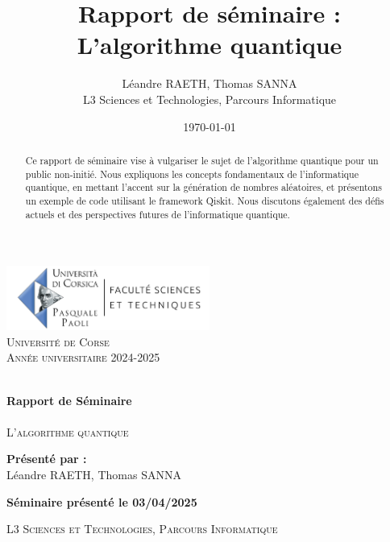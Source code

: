 \documentclass{article}
\title{Rapport de séminaire :\\L'algorithme quantique}
\author{Léandre RAETH, Thomas SANNA\\L3 Sciences et Technologies, Parcours Informatique}
\date{\today}
\begin{document}
\begin{titlepage}
  \begin{center}
      \includegraphics[width=0.5\textwidth]{img/univCorse.png}\\[1cm]
      
      \textsc{\LARGE Université de Corse}\\[1.5cm]
      
      \textsc{\Large Année universitaire 2024-2025}\\[0.5cm]
      
      \vfill
      
      \hrulefill\\[0.4cm]
      {\Huge \bfseries Rapport de Séminaire}\\[0.4cm]
      \hrulefill\\[1.5cm]
      
      \textsc{\Large L'algorithme quantique}\\[0.5cm]
      
      \vfill
      
      \textbf{Présenté par :}\\
      Léandre RAETH, Thomas SANNA\\
      
      \vfill
      
      \textbf{Séminaire présenté le 03/04/2025}\\
      \vfill
      
      \textsc{L3 Sciences et Technologies, Parcours Informatique}
      
  \end{center}
\end{titlepage}

\break\begin{abstract}
  Ce rapport de séminaire vise à vulgariser le sujet de l'algorithme quantique pour un public non-initié. Nous expliquons les concepts fondamentaux de l'informatique quantique, en mettant l'accent sur la génération de nombres aléatoires, et présentons un exemple de code utilisant le framework Qiskit. Nous discutons également des défis actuels et des perspectives futures de l'informatique quantique.
\end{abstract}

\break\tableofcontents
\end{document}
